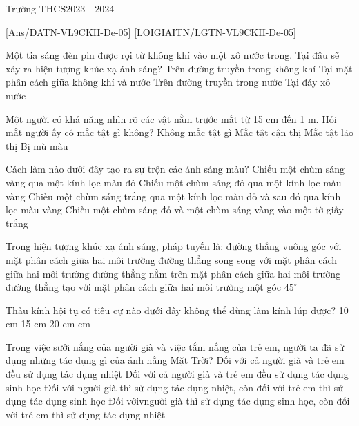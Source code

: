 \begin{name}{Trường THCS}{2023 - 2024}
\end{name}
[Ans/DATN-VL9CKII-De-05]
\hienthiloigiaiex
{}[LOIGIAITN/LGTN-VL9CKII-De-05]


\begin{ex}
	Một tia sáng đèn pin được rọi từ không khí vào một xô nước trong. Tại đâu sẽ xảy ra hiện tượng khúc xạ ánh sáng?
	\choice
	{Trên đường truyền trong không khí}
	{\True Tại mặt phân cách giữa không khí và nước}
	{Trên đường truyền trong nước}
	{Tại đáy xô nước}
	\loigiai{}
\end{ex}
\begin{ex}
	Một người có khả năng nhìn rõ các vật nằm trước mắt từ 15 cm đến 1 m. Hỏi mắt người ấy có mắc tật gì không?
	\choice
	{Không mắc tật gì}
	{\True Mắc tật cận thị}
	{Mắc tật lão thị}
	{Bị mù màu}
	\loigiai{}
\end{ex}
\begin{ex}
	Cách làm nào dưới đây tạo ra sự trộn các ánh sáng màu?
	\choice
	{Chiếu một chùm sáng vàng qua một kính lọc màu đỏ}
	{Chiếu một chùm sáng đỏ qua một kính lọc màu vàng}
	{Chiếu một chùm sáng trắng qua một kính lọc màu đỏ và sau đó qua kính lọc màu vàng}
	{\True Chiếu một chùm sáng đỏ và một chùm sáng vàng vào một tờ giấy trắng}
	\loigiai{}
\end{ex}
\begin{ex}
	Trong hiện tượng khúc xạ ánh sáng, pháp tuyến là:
	\choice
	{\True đường thẳng vuông góc với mặt phân cách giữa hai môi trường}
	{đường thẳng song song với mặt phân cách giữa hai môi trường}
	{đường thẳng nằm trên mặt phân cách giữa hai môi trường}
	{đường thẳng tạo với mặt phân cách giữa hai môi trường một góc $45^\circ$}
	\loigiai{}
\end{ex}
\begin{ex}
	Thấu kính hội tụ có tiêu cự nào dưới đây không thể dùng làm kính lúp được?
	\choice
	{10 cm}
	{15 cm}
	{20 cm}
	{ cm}
	\loigiai{}
\end{ex}
\begin{ex}
	Trong việc sưởi nắng của người già và việc tắm nắng của trẻ em, người ta đã sử dụng những tác dụng gì của ánh nắng Mặt Trời?
	\choice
	{Đối với cả người già và trẻ em đều sử dụng tác dụng nhiệt}
	{Đối với cả người già và trẻ em đều sử dụng tác dụng sinh học}
	{\True Đối với người già thì sử dụng tác dụng nhiệt, còn đối với trẻ em thì sử dụng tác dụng sinh học}
	{Đối vớivngười già thì sử dụng tác dụng sinh học, còn đối với trẻ em thì sử dụng tác dụng nhiệt}
	\loigiai{}
\end{ex}
